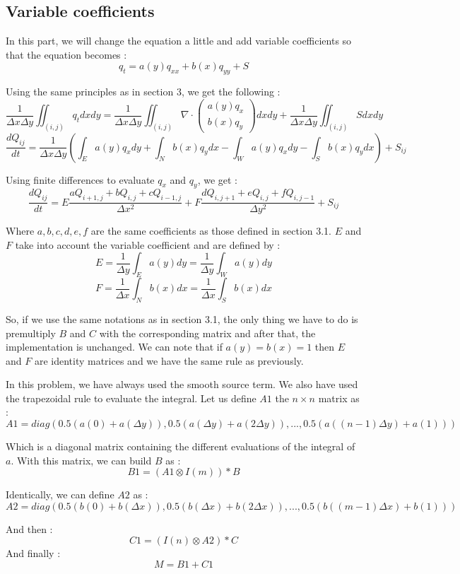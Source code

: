 \subsection{Variable coefficients}
In this part, we will change the equation a little and add variable coefficients so that the equation becomes : 
$$q_t = a(y)q_{xx}+b(x)q_{yy}+S$$

Using the same principles as in section 3, we get the following :
$$\frac{1}{\Delta x \Delta y} \iint_{(i,j)} q_tdxdy = \frac{1}{\Delta x \Delta y} \iint_{(i,j)} \nabla \cdot \left(\begin{array}{c}
a(y)q_x \\ 
b(x)q_y
\end{array}\right) dxdy + \frac{1}{\Delta x \Delta y}\iint_{(i,j)}Sdxdy $$ 
$$\frac{dQ_{ij}}{dt} = \frac{1}{\Delta x \Delta y}(\int_E a(y)q_xdy + \int_N b(x)q_ydx - \int_Wa(y)q_xdy - \int_S b(x)q_ydx) + S_{ij}$$

Using finite differences to evaluate $q_x$ and $q_y$, we get : 
$$\frac{dQ_{ij}}{dt} = E\frac{aQ_{i+1,j}+bQ_{i,j}+cQ_{i-1,j}}{\Delta x^2}+F\frac{dQ_{i,j+1}+eQ_{i,j}+fQ_{i,j-1}}{\Delta y^2}+S_{ij}$$

Where $a,b,c,d,e,f$ are the same coefficients as those defined in section 3.1. $E$ and $F$ take into account the variable coefficient and are defined by : 
$$E = \frac{1}{\Delta y}\int_E a(y)dy= \frac{1}{\Delta y}\int_W a(y)dy$$
$$F = \frac{1}{\Delta x}\int_N b(x)dx= \frac{1}{\Delta x}\int_S b(x)dx$$

So, if we use the same notations as in section 3.1, the only thing we have to do is premultiply $B$ and $C$ with the corresponding matrix and after that, the implementation is unchanged. We can note that if $a(y)=b(x)=1$ then $E$ and $F$ are identity matrices and we have the same rule as previously.

In this problem, we have always used the smooth source term. We also have used the trapezoidal rule to evaluate the integral. Let us define $A1$ the $n \times n$ matrix as :
$$A1 = diag(0.5(a(0)+a(\Delta y)),0.5(a(\Delta y)+a(2\Delta y)),...,0.5(a((n-1)\Delta y)+a(1)))$$

Which is a diagonal matrix containing the different evaluations of the integral of $a$. With this matrix, we can build $B$ as :
$$B1 = (A1\otimes I(m))*B$$

Identically, we can define $A2$ as :
$$A2 = diag(0.5(b(0)+b(\Delta x)),0.5(b(\Delta x)+b(2\Delta x)),...,0.5(b((m-1)\Delta x)+b(1)))$$

And then : 
$$C1 = (I(n)\otimes A2)*C$$
And finally : 
$$M = B1 + C1$$

